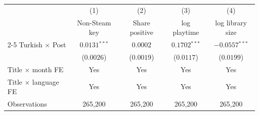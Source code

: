 \begin{tabular}{lcccc}
\toprule
 & (1) & (2) & (3) & (4) \\
 & Non-Steam key & Share positive & log playtime & log library size \\
\cmidrule(lr){2-5}
Turkish $\times$ Post & $0.0131$$^{***}$ & $0.0002$ & $0.1702$$^{***}$ & $-0.0557$$^{***}$ \\
 & ($0.0026$) & ($0.0019$) & ($0.0117$) & ($0.0199$) \\[3pt]
\midrule
Title $\times$ month FE & Yes & Yes & Yes & Yes \\
Title $\times$ language FE & Yes & Yes & Yes & Yes \\
Observations & 265,200 & 265,200 & 265,200 & 265,200 \\
\bottomrule
\end{tabular}
